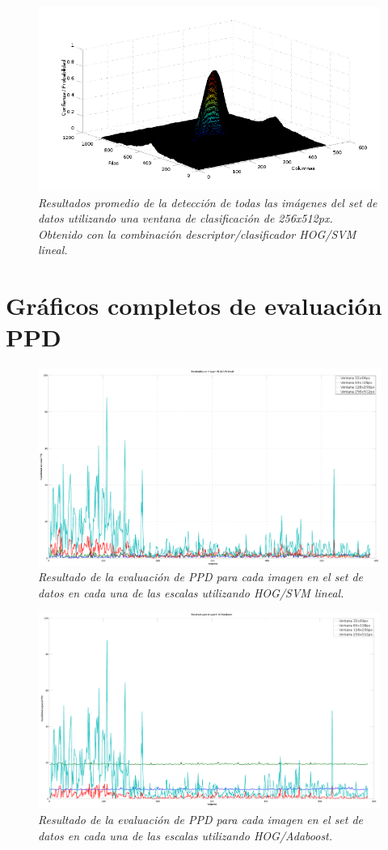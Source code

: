 \begin{figure}[H]
  \centering
  \includegraphics[scale=.6]{images/mean/svm/256}
  \caption{\em  Resultados promedio de la detección de todas las imágenes del set de datos utilizando una ventana de clasificación de 256x512px. Obtenido con la combinación descriptor/clasificador HOG/SVM lineal.}  
  \label{fig:gp8}
\end{figure}


\section{Gráficos completos de evaluación PPD}

\begin{figure}[H]
  \centering
  \includegraphics[scale=.25]{images/fullresultssvm}
  \caption{\em  Resultado de la evaluación de PPD para cada imagen en el set de datos en cada una de las escalas utilizando HOG/SVM lineal.}  
  \label{fig:gcsvm}
\end{figure}

\begin{figure}[H]
  \centering
  \includegraphics[scale=.25]{images/fullresultsboost}
  \caption{\em  Resultado de la evaluación de PPD para cada imagen en el set de datos en cada una de las escalas utilizando HOG/Adaboost.}  
  \label{fig:gcboost}
\end{figure}
